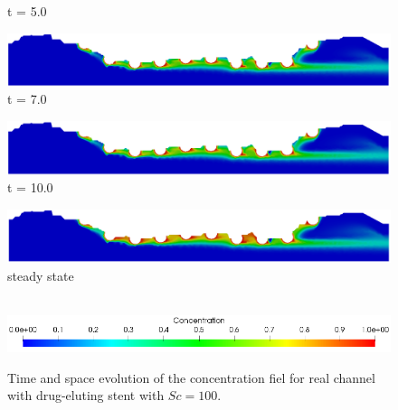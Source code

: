 \begin{figure}[H]
\begin{minipage}{.50\linewidth}
      t = 5.0
     \end{minipage}%
     \begin{minipage}{.50\linewidth}
      \centering
      \includegraphics[scale=0.18]{./02_chaps/cap_solution/figure/conc100_RealStrut6.png}\\
      t = 7.0
     \end{minipage}
     \begin{minipage}{.50\linewidth}
     \medskip
      \centering
      \includegraphics[scale=0.18]{./02_chaps/cap_solution/figure/conc100_RealStrut7.png}\\
      t = 10.0
     \end{minipage}%
     \begin{minipage}{.50\linewidth}
     \medskip
      \centering
      \includegraphics[scale=0.18]{./02_chaps/cap_solution/figure/conc100_RealStrut8.png}\\
      steady state
     \end{minipage}\\[10pt]
      \centering
      \includegraphics[scale=0.5]{./02_chaps/cap_solution/figure/conc1_RealStrutScale.png}\\
     \medskip
    \caption{
Time and space evolution of the concentration fiel for real channel with drug-eluting stent with $Sc=100$.}
     \label{conc field real stent sc 100}
\end{figure}


